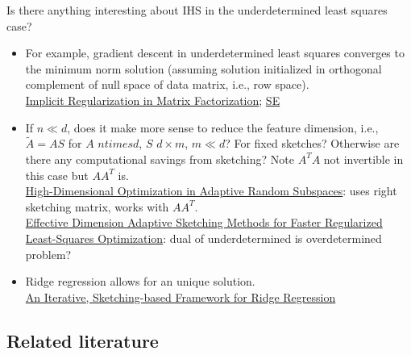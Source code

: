 \documentclass[10pt]{article}
\begin{document}
Is there anything interesting about IHS in the underdetermined least squares case?
\begin{itemize}

\item
For example, gradient descent in underdetermined least squares converges to the minimum norm solution (assuming solution initialized in orthogonal complement of null space of data matrix, i.e., row space). \\
\href{https://arxiv.org/pdf/1705.09280.pdf}{Implicit Regularization in Matrix Factorization}; \href{https://math.stackexchange.com/questions/3451272/does-gradient-descent-converge-to-a-minimum-norm-solution-in-least-squares-probl}{SE}

\item
If $n\ll d$, does it make more sense to reduce the feature dimension, i.e., $\tilde{A}=AS$ for $A$ $n times d$, $S$ $d\times m$, $m\ll d$? For fixed sketches? Otherwise are there any computational savings from sketching? Note $A^TA$ not invertible in this case but $AA^T$ is. \\
\href{https://proceedings.neurips.cc/paper/2019/file/51425b752a0b402ed3effc83fc4bbb74-Paper.pdf}{High-Dimensional Optimization in Adaptive Random Subspaces}: uses right sketching matrix, works with $AA^T$. \\
\href{https://arxiv.org/pdf/2006.05874.pdf}{Effective Dimension Adaptive Sketching Methods for Faster Regularized Least-Squares Optimization}: dual of underdetermined is overdetermined problem?

\item
Ridge regression allows for an unique solution. \\
\href{https://proceedings.mlr.press/v80/chowdhury18a/chowdhury18a.pdf}{An Iterative, Sketching-based Framework for Ridge Regression}

\end{itemize}


\subsection{Related literature}
\end{document}
